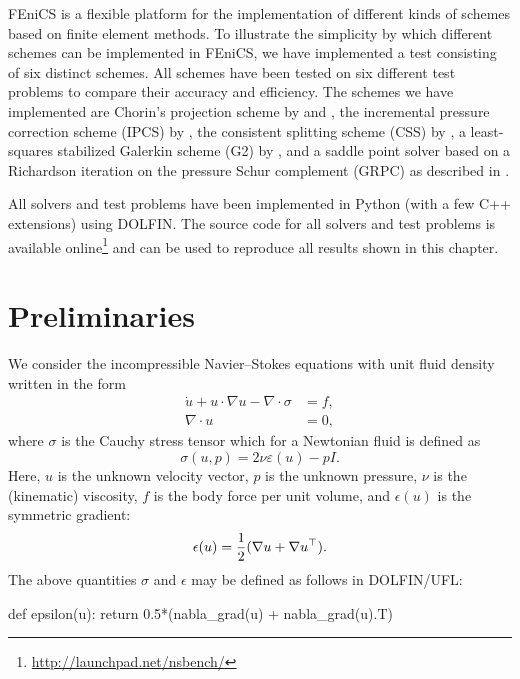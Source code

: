 FEniCS is a flexible platform for the implementation of different
kinds of schemes based on finite element methods. To illustrate the
simplicity by which different schemes can be implemented in FEniCS, we
have implemented a test consisting of six distinct schemes. All
schemes have been tested on six different test problems to compare
their accuracy and efficiency. The schemes we have implemented are
Chorin's projection scheme by \citet{Chorin1968} and
\citet{Temam1969}, the incremental pressure correction scheme (IPCS)
by \citet{Goda1979}, the consistent splitting scheme (CSS) by
\citet{GuermondMinevShen2006}, a least-squares stabilized Galerkin
scheme (G2) by \citet{HoffmanJohnson2007}, and a saddle point solver
based on a Richardson iteration on the pressure Schur complement
(GRPC) as described in \citet{Turek1996}.

\enlargethispage{-15pt}

All solvers and test problems have been implemented in Python (with a
few C++ extensions) using DOLFIN. The source code for all solvers and
test problems is available
online\footnote{\url{http://launchpad.net/nsbench/}} and can be used
to reproduce all results shown in this chapter.

\section{Preliminaries}

We consider the incompressible Navier--Stokes equations with unit
fluid density written in the form
\begin{align}
  \label{eq:ns,mom}
  \dot{u} + u \cdot \nabla u - \nabla \cdot \sigma &= f, \\
  \label{eq:ns,con}
  \nabla \cdot u &= 0,
\end{align}
where $\sigma$ is the Cauchy stress tensor which for a Newtonian fluid
is defined as
\begin{equation}
\sigma(u,p) = 2\nu\varepsilon(u) - pI.
\end{equation}
Here, $u$ is the unknown velocity vector, $p$ is the unknown pressure,
$\nu$ is the (kinematic) viscosity, $f$ is the body force per unit
volume, and $\epsilon(u)$ is the symmetric gradient:\vspace*{3pt}
\begin{equation}
\epsilon(u) = \frac{1}{2} (\nabla u + \nabla u^{\top}).\vspace*{3pt}
\end{equation}
The above quantities $\sigma$ and $\epsilon$ may be defined as follows
in DOLFIN/UFL:\vspace*{4pt}
\begin{python}
def epsilon(u):
    return 0.5*(nabla_grad(u) + nabla_grad(u).T)
\end{python}

